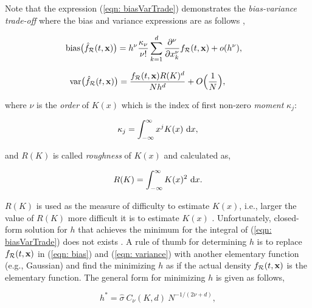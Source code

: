 \documentclass{ifacconf}
\newcommand{\Rconf}{{\mathcal R}}
\newcommand{\bx}{{\bf x}}
\begin{document}
Note that the expression (\ref{eqn: biasVarTrade}) demonstrates the \emph{bias-variance trade-off} where the bias and variance expressions are as follows \cite{hansen2009lecture},

\begin{align} \label{eqn: bias}
	\textnormal{bias}\big(\hat{f}_\Rconf(t,\bx)\big) %
										     &=  h^\nu \frac{\kappa_\nu}{\nu!} \sum_{k=1}^d \frac{\partial^\nu}{\partial x_k^\nu} f_\Rconf(t,\bx) + o(h^\nu),
\end{align}

\begin{align}  \label{eqn: variance}
	\hspace{-5mm}\textnormal{var}\big(\hat{f}_\Rconf(t,\bx)\big) %
										     &= \frac{f_\Rconf(t,\bx) R(K)^d}{N h^d} + O\Big(\frac{1}{N}\Big), 
\end{align}

where $\nu$ is the \emph{order} of $K(x)$ which is the index of first non-zero \emph{moment} $\kappa_j$:

\begin{equation*}
	\kappa_j = \int_{-\infty}^{\infty} x^j K(x) \ \textnormal{d}x ,
\end{equation*}

and $R(K)$ is called \emph{roughness} of $K(x)$ and calculated as,

\begin{equation*}
	R(K) = \int_{-\infty}^{\infty} K(x)^2 \ \textnormal{d}x.
\end{equation*}

$R(K)$ is used  as the measure of difficulty to estimate $K(x)$, i.e., larger the value of $R(K)$ more difficult it is to estimate $K(x)$ \cite{sheather2004density}.  Unfortunately, closed-form solution for $h$ that achieves the minimum for the integral of (\ref{eqn: biasVarTrade}) does not exists \cite{hansen2009lecture}. A rule of thumb for determining $h$ is to replace $f_\Rconf(t,\bx)$ in (\ref{eqn: bias}) and (\ref{eqn: variance}) with another elementary function (e.g., Gaussian) and find the minimizing $h$ as if the actual density $f_\Rconf(t,\bx)$ is the elementary function. The general form for minimizing $h$ is given as follows, 

\begin{equation}
	h^* = \hat{\sigma} \ C_\nu(K,d) \ N^{-1/(2\nu + d)},
\end{equation} 
\end{document}
